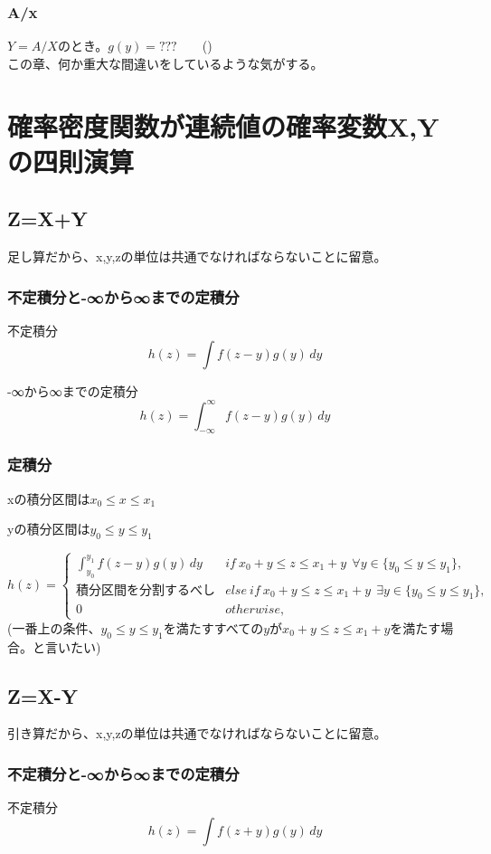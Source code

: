 \documentclass[a4paper,11pt]{ltjsarticle}
\begin{document}
\subsubsection{A/x}
$Y=A/X$のとき。$g(y) = ???$\ \ \ \ ()\\
この章、何か重大な間違いをしているような気がする。
\newpage


\section{確率密度関数が連続値の確率変数X,Yの四則演算}
\subsection{Z=X+Y}
足し算だから、x,y,zの単位は共通でなければならないことに留意。
\subsubsection{不定積分と-∞から∞までの定積分}
不定積分
$$
    h(z) = \int f(z-y) g(y)\,dy
$$

-∞から∞までの定積分
$$
    h(z) = \int_{-\infty}^{\infty} f(z-y) g(y)\,dy
$$
\subsubsection{定積分}
\begin{description}
    \item xの積分区間は$x_0 \leq x \leq x_1$
    \item yの積分区間は$y_0 \leq y \leq y_1$
\end{description}
$$
    h(z)=
    \begin{cases}
        \int_{y_0}^{y_1} f(z-y) g(y)\,dy    & if\ x_0+y \leq z \leq x_1+y \ \ \forall y\in \{ y_0 \leq y \leq y_1\}, \\
        積分区間を分割するべし                & else \ if\ x_0+y \leq z \leq x_1+y \ \ \exists y\in \{ y_0 \leq y \leq y_1\}, \\
        0                                   & otherwise,
    \end{cases}
$$
(一番上の条件、$y_0 \leq y \leq y_1$を満たすすべての$y$が$x_0+y \leq z \leq x_1+y$を満たす場合。と言いたい)


\subsection{Z=X-Y}
引き算だから、x,y,zの単位は共通でなければならないことに留意。
\subsubsection{不定積分と-∞から∞までの定積分}
不定積分
$$
    h(z) = \int f(z+y) g(y)\,dy
$$
\end{document}
